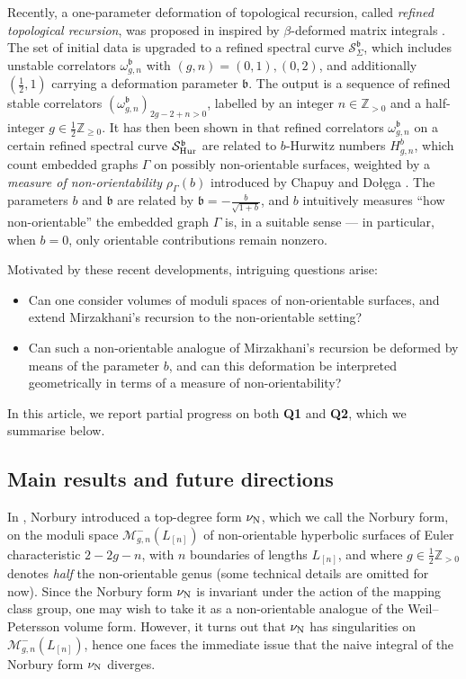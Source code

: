 \documentclass[12pt]{amsart}
\theoremstyle{plain}
\theoremstyle{definition}
\theoremstyle{remark}
\numberwithin{equation}{section}
\begin{document}
Recently, a one-parameter deformation of topological recursion, called \emph{refined topological recursion}, was proposed in \cite{KO22,Osu23-1,Osu23-2} inspired by $\beta$-deformed matrix integrals \cite{CE06}. The set of initial data is upgraded to a refined spectral curve $\mathcal{S}_\Sigma^\mathfrak{b}$, which includes unstable correlators $\omega_{g,n}^\mathfrak{b}$ with $(g,n)=(0,1), (0,2)$, and additionally $(\frac12,1)$ carrying a deformation parameter $\mathfrak{b}$. The output is a sequence of refined stable correlators $(\omega^\mathfrak{b}_{g,n})_{2g-2+n>0}$, labelled by an integer $n\in\mathbb{Z}_{>0}$ and a half-integer $g\in\frac12\mathbb{Z}_{\geq0}$. It has then been shown in \cite{CDO24-1,CDO24-2} that refined correlators $\omega^\mathfrak{b}_{g,n}$ on a certain refined spectral curve $\mathcal{S}^\mathfrak{b}_{\rm Hur}$ are related to $b$-Hurwitz numbers $H_{g,n}^b$, which count embedded graphs $\Gamma$ on possibly non-orientable surfaces, weighted by a \emph{measure of non-orientability} $\rho_\Gamma(b)$ introduced by Chapuy and Do\l\k{e}ga \cite{CD20}. The parameters $b$ and $\mathfrak{b}$ are related by $\mathfrak{b}=-\frac{b}{\sqrt{1+b}}$, and $b$ intuitively measures ``how non-orientable'' the embedded graph $\Gamma$ is, in a suitable sense --- in particular, when $b=0$, only orientable contributions remain nonzero.

\medskip

Motivated by these recent developments, intriguing questions arise:

\begin{itemize}
\item[\textbf{Q1:}] Can one consider volumes of moduli spaces of non-orientable surfaces, and extend Mirzakhani's recursion to the non-orientable setting?
\item[\textbf{Q2:}] Can such a non-orientable analogue of Mirzakhani's recursion be deformed by means of the parameter $b$, and can this deformation be interpreted geometrically in terms of a measure of non-orientability?
\end{itemize}
In this article, we report partial progress on both \textbf{Q1} and \textbf{Q2}, which we summarise below.

\subsection{Main results and future directions}

In \cite{Nor07}, Norbury introduced a top-degree form $\nu_{\rm N}$, which we call the Norbury form, on the moduli space $\mathcal{M}^-_{g,n}(L_{[n]})$ of non-orientable hyperbolic surfaces of Euler characteristic $2-2g-n$, with $n$ boundaries of lengths $L_{[n]}$, and where $g\in\frac12\mathbb{Z}_{>0}$ denotes \emph{half} the non-orientable genus (some technical details are omitted for now). Since the Norbury form $\nu_{\rm N}$ is invariant under the action of the mapping class group, one may wish to take it as a non-orientable analogue of the Weil--Petersson volume form. However, it turns out that $\nu_{\rm N}$ has singularities on $\mathcal{M}^-_{g,n}(L_{[n]})$, hence one faces the immediate issue that the naive integral of the Norbury form $\nu_{\rm N}$ diverges. 
\end{document}

